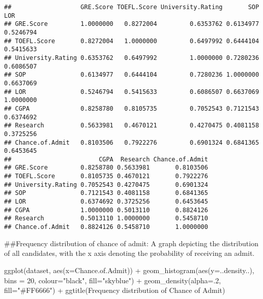 \documentclass[
]{article}
\newenvironment{Shaded}{\begin{snugshade}}{\end{snugshade}}
\newcommand{\AttributeTok}[1]{\textcolor[rgb]{0.77,0.63,0.00}{#1}}
\newcommand{\DecValTok}[1]{\textcolor[rgb]{0.00,0.00,0.81}{#1}}
\newcommand{\FunctionTok}[1]{\textcolor[rgb]{0.00,0.00,0.00}{#1}}
\newcommand{\NormalTok}[1]{#1}
\newcommand{\SpecialCharTok}[1]{\textcolor[rgb]{0.00,0.00,0.00}{#1}}
\newcommand{\StringTok}[1]{\textcolor[rgb]{0.31,0.60,0.02}{#1}}
\begin{document}
\begin{verbatim}
##                   GRE.Score TOEFL.Score University.Rating       SOP       LOR
## GRE.Score         1.0000000   0.8272004         0.6353762 0.6134977 0.5246794
## TOEFL.Score       0.8272004   1.0000000         0.6497992 0.6444104 0.5415633
## University.Rating 0.6353762   0.6497992         1.0000000 0.7280236 0.6086507
## SOP               0.6134977   0.6444104         0.7280236 1.0000000 0.6637069
## LOR               0.5246794   0.5415633         0.6086507 0.6637069 1.0000000
## CGPA              0.8258780   0.8105735         0.7052543 0.7121543 0.6374692
## Research          0.5633981   0.4670121         0.4270475 0.4081158 0.3725256
## Chance.of.Admit   0.8103506   0.7922276         0.6901324 0.6841365 0.6453645
##                        CGPA  Research Chance.of.Admit
## GRE.Score         0.8258780 0.5633981       0.8103506
## TOEFL.Score       0.8105735 0.4670121       0.7922276
## University.Rating 0.7052543 0.4270475       0.6901324
## SOP               0.7121543 0.4081158       0.6841365
## LOR               0.6374692 0.3725256       0.6453645
## CGPA              1.0000000 0.5013110       0.8824126
## Research          0.5013110 1.0000000       0.5458710
## Chance.of.Admit   0.8824126 0.5458710       1.0000000
\end{verbatim}

\#\#Frequency distribution of chance of admit: A graph depicting the
distribution of all candidates, with the x axis denoting the probability
of receiving an admit.

\begin{Shaded}
\begin{Highlighting}[]
\FunctionTok{ggplot}\NormalTok{(dataset, }\FunctionTok{aes}\NormalTok{(}\AttributeTok{x=}\NormalTok{Chance.of.Admit)) }\SpecialCharTok{+} 
    \FunctionTok{geom\_histogram}\NormalTok{(}\FunctionTok{aes}\NormalTok{(}\AttributeTok{y=}\NormalTok{..density..),      }
                   \AttributeTok{bins =} \DecValTok{20}\NormalTok{,}
                   \AttributeTok{colour=}\StringTok{"black"}\NormalTok{, }\AttributeTok{fill=}\StringTok{"skyblue"}\NormalTok{) }\SpecialCharTok{+}
    \FunctionTok{geom\_density}\NormalTok{(}\AttributeTok{alpha=}\NormalTok{.}\DecValTok{2}\NormalTok{, }\AttributeTok{fill=}\StringTok{"\#FF6666"}\NormalTok{) }\SpecialCharTok{+} 
  \FunctionTok{ggtitle}\NormalTok{(}\StringTok{\textquotesingle{}Frequency distribution of Chance of Admit\textquotesingle{}}\NormalTok{)}
\end{Highlighting}
\end{Shaded}
\end{document}
